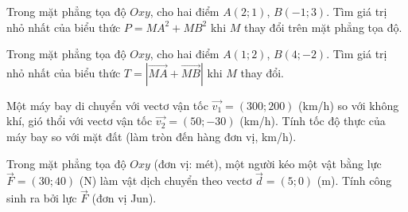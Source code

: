 \begin{bt}%
Trong mặt phẳng tọa độ $Oxy$, cho hai điểm $A(2;1)$, $B(-1;3)$. Tìm giá trị nhỏ nhất của biểu thức $P=MA^2+MB^2$ khi $M$ thay đổi trên mặt phẳng tọa độ.
\end{bt}

\begin{bt}%
Trong mặt phẳng tọa độ $Oxy$, cho hai điểm $A(1;2)$, $B(4;-2)$. Tìm giá trị nhỏ nhất của biểu thức $T=|\vec{MA}+\vec{MB}|$ khi $M$ thay đổi.
\end{bt}

\begin{bt}%
Một máy bay di chuyển với vectơ vận tốc $\vec{v_1}=(300;200)$ (km/h) so với không khí, gió thổi với vectơ vận tốc $\vec{v_2}=(50;-30)$ (km/h). Tính tốc độ thực của máy bay so với mặt đất (làm tròn đến hàng đơn vị, km/h).
\end{bt}

\begin{bt}%
Trong mặt phẳng tọa độ $Oxy$ (đơn vị: mét), một người kéo một vật bằng lực $\vec{F}=(30;40)$ (N) làm vật dịch chuyển theo vectơ $\vec{d}=(5;0)$ (m). Tính công sinh ra bởi lực $\vec{F}$ (đơn vị Jun).
\end{bt}

